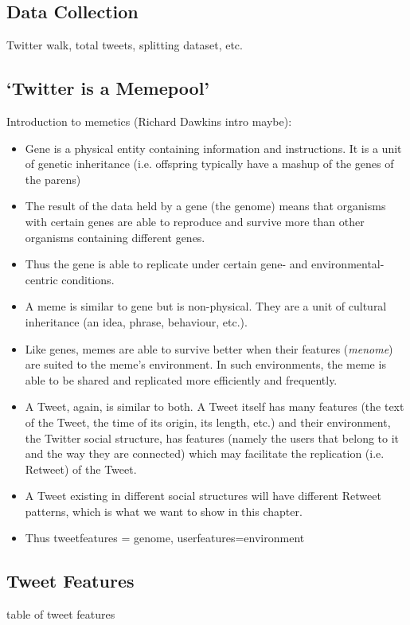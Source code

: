 \subsection{Data Collection}
Twitter walk, total tweets, splitting dataset, etc.

\subsection{`Twitter is a Memepool'}
Introduction to memetics (Richard Dawkins intro maybe):
\\
\begin{itemize}
\item Gene is a physical entity containing information and instructions. It is a unit of genetic inheritance (i.e. offspring typically have a mashup of the genes of the parens)
\item The result of the data held by a gene (the genome) means that organisms with certain genes are able to reproduce and survive more than other organisms containing different genes.
\item Thus the gene is able to replicate under certain gene- and environmental-centric conditions.
\item A meme is similar to  gene but is non-physical. They are a unit of cultural inheritance (an idea, phrase, behaviour, etc.).
\item Like genes, memes are able to survive better when their features (\textit{menome}) are suited to the meme's environment. In such environments, the meme is able to be shared and replicated more efficiently and frequently.
\item A Tweet, again, is similar to both. A Tweet itself has many features (the text of the Tweet, the time of its origin, its length, etc.) and their environment, the Twitter social structure, has features (namely the users that belong to it and the way they are connected) which may facilitate the replication (i.e. Retweet) of the Tweet.
\item A Tweet existing in different social structures will have different Retweet patterns, which is what we want to show in this chapter.
\item Thus tweetfeatures = genome, userfeatures=environment
\end{itemize}

\subsection{Tweet Features}
table of tweet features

